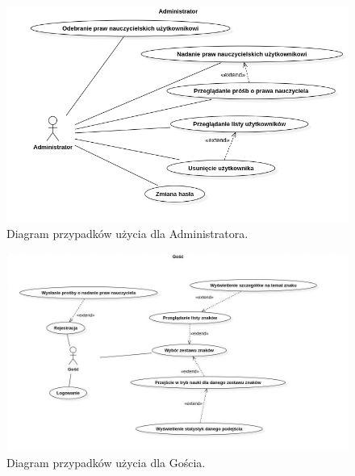 \documentclass[a4paper,twoside,12pt]{book}
\begin{document}
\begin{figure}[]
\centering
\includegraphics[width=\textwidth]{Admin}
\caption{Diagram przypadków użycia dla Administratora.}
\label{fig:etykieta-rysunku}
\end{figure}
\begin{figure}[]
\centering
\includegraphics[width=\textwidth]{Gość}
\caption{Diagram przypadków użycia dla Gościa.}
\label{fig:etykieta-rysunku}
\end{figure}


\end{document}
